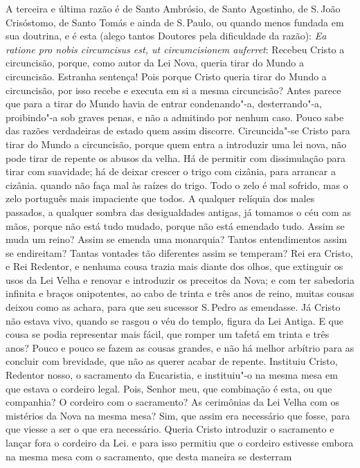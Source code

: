 A terceira e última razão é de Santo Ambrósio, de Santo Agostinho, de S.\,João Crisóstomo, de Santo Tomás e ainda de S.\,Paulo, ou quando menos
fundada em sua doutrina, e é esta (alego tantos Doutores pela
dificuldade da razão): \emph{Ea ratione pro nobis circumcisus est, ut
circumcisionem auferret}: Recebeu Cristo a circuncisão, porque, como
autor da Lei Nova, queria tirar do Mundo a circuncisão. Estranha
sentença! Pois porque Cristo queria tirar do Mundo a circuncisão, por
isso recebe e executa em si a mesma circuncisão? Antes parece que para
a tirar do Mundo havia de entrar condenando"-a, desterrando"-a,
proibindo"-a sob graves penas, e não a admitindo por nenhum caso.
Pouco sabe das razões verdadeiras de estado quem assim discorre.
Circuncida"-se Cristo para tirar do Mundo a circuncisão, porque quem
entra a
introduzir uma lei nova, não pode tirar de repente os abusos da velha.
Há de permitir com dissimulação para tirar com suavidade; há de deixar
crescer o trigo com cizânia, para arrancar a cizânia. quando não faça
mal às raízes do trigo. Todo o zelo é mal sofrido, mas o zelo português
mais impaciente que todos. A qualquer relíquia dos males passados, a
qualquer sombra das desigualdades antigas, já tomamos o céu com as mãos,
porque não está tudo mudado, porque não está emendado tudo. Assim se
muda um reino? Assim se emenda uma monarquia? Tantos entendimentos assim
se endireitam? Tantas vontades tão diferentes assim se temperam? Rei era
Cristo, e Rei Redentor, e nenhuma cousa trazia mais diante dos olhos,
que extinguir os usos da Lei Velha e renovar e introduzir os preceitos
da Nova; e com ter
sabedoria infinita e braços onipotentes, ao cabo de trinta e três anos
de reino, muitas cousas deixou como as achara, para que seu sucessor S.\,Pedro as emendasse. Já Cristo não estava vivo, quando se rasgou o véu do
templo, figura da Lei Antiga. E que cousa se podia representar mais
fácil, que romper um tafetá em trinta e três anos? Pouco e pouco se
fazem as cousas grandes, e não há melhor arbítrio para as concluir com
brevidade, que não as querer acabar de repente.
Instituiu Cristo, Redentor nosso, o sacramento da Eucaristia, e
instituiu"-o na mesma mesa em que estava o cordeiro legal. Pois, Senhor
meu, que combinação é esta, ou que companhia? O cordeiro com o
sacramento? As cerimônias da Lei Velha com os mistérios da Nova na mesma
mesa? Sim, que assim era necessário que fosse, para que viesse a ser
o que era necessário. Queria Cristo introduzir o sacramento e lançar
fora o cordeiro da Lei. e para isso permitiu que o cordeiro estivesse
embora na mesma mesa com o sacramento, que desta maneira se desterram
